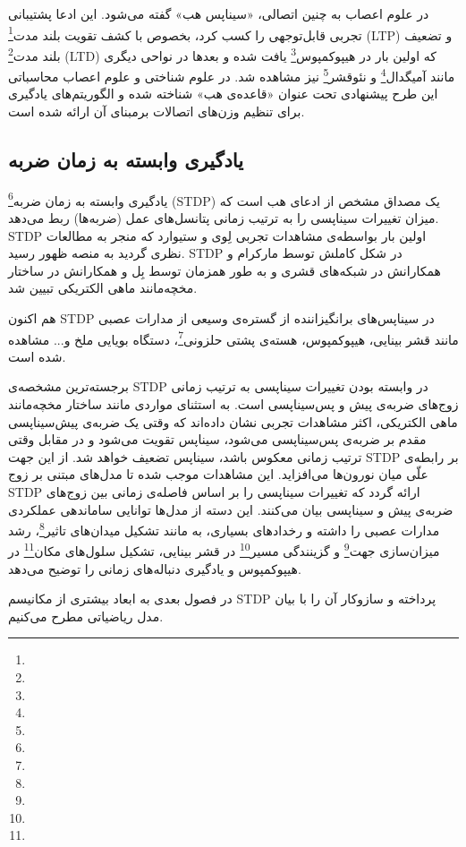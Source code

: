 در علوم اعصاب به چنین اتصالی، «سیناپس هب» گفته می‌شود. این ادعا پشتیبانی تجربی قابل‌توجهی را کسب کرد، بخصوص با کشف تقویت بلند مدت\footnote{} (LTP) و تضعیف بلند مدت\footnote{} (LTD) که اولین بار در هیپوکمپوس\footnote{} یافت شده\cite{bliss1973long} و بعدها در نواحی دیگری مانند آمیگدال\footnote{} و نئوقشر\footnote{} نیز مشاهده شد. در علوم شناختی و علوم اعصاب محاسباتی این طرح پیشنهادی تحت عنوان «قاعده‌ی هب» شناخته شده و الگوریتم‌های یادگیری برای تنظیم وزن‌های اتصالات برمبنای آن ارائه شده است.

\subsection{یادگیری وابسته به زمان ضربه}
یادگیری وابسته به زمان ضربه\footnote{} (STDP) یک مصداق مشخص از ادعای هب است که میزان تغییرات سیناپسی را به ترتیب زمانی پتانسل‌های عمل (ضربه‌ها) ربط می‌دهد. STDP اولین بار بواسطه‌ی مشاهدات تجربی لِوی و ستیوارد\cite{levy1983temporal} که منجر به مطالعات نظری گردید به منصه ظهور رسید. STDP در شکل کاملش توسط مارکرام و همکارانش\cite{markram1997regulation} در شبکه‌های قشری و به طور همزمان توسط بِل و همکارانش\cite{bell1997synaptic} در ساختار مخچه‌مانند ماهی الکتریکی تبیین شد. 

هم اکنون STDP در سیناپس‌های برانگیزاننده از گستره‌ی وسیعی از مدارات عصبی مانند قشر بینایی، هیپوکمپوس، هسته‌ی پشتی حلزونی\footnote{}، دستگاه بویایی ملخ و... مشاهده شده است. 

برجسته‌ترین مشخصه‌ی STDP در وابسته بودن تغییرات سیناپسی به ترتیب زمانی زوج‌های ضربه‌ی پیش و پس‌سیناپسی است. به استثنای مواردی مانند ساختار مخچه‌مانند ماهی الکتریکی، اکثر مشاهدات تجربی نشان داده‌اند که وقتی یک ضربه‌ی پیش‌سیناپسی مقدم بر ضربه‌ی پس‌سیناپسی می‌شود، سیناپس تقویت می‌شود و در مقابل وقتی ترتیب زمانی معکوس باشد، سیناپس تضعیف خواهد شد. از این جهت STDP بر رابطه‌ی علّی میان نورون‌ها می‌افزاید. این مشاهدات موجب شده تا مدل‌های مبتنی بر زوج STDP ارائه گردد که تغییرات سیناپسی را بر اساس فاصله‌ی زمانی بین زوج‌های ضربه‌ی پیش و سیناپسی بیان می‌کنند. این دسته از مدل‌ها توانایی ساماندهی عملکردی مدارات عصبی را داشته و رخدادهای بسیاری، به مانند تشکیل میدان‌های تاثیر\footnote{}، رشد میزان‌سازی جهت\footnote{} و گزینندگی مسیر\footnote{} در قشر بینایی، تشکیل سلول‌های مکان\footnote{} در هیپوکمپوس و یادگیری دنباله‌های زمانی را توضیح می‌دهد. 

در فصول بعدی به ابعاد بیشتری از مکانیسم STDP پرداخته و سازوکار آن را با بیان مدل ریاضیاتی مطرح می‌کنیم.